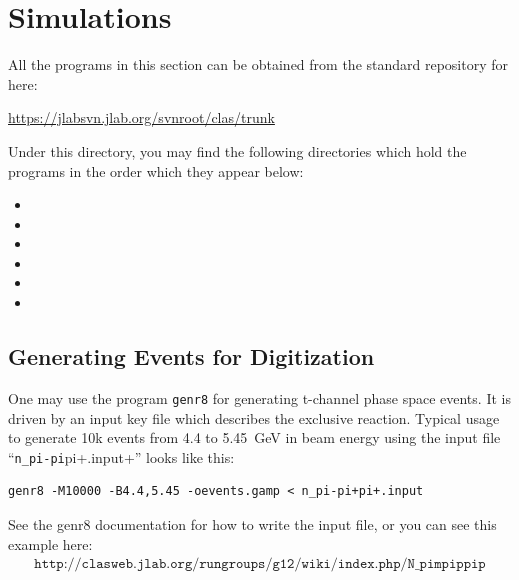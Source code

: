 \section{\label{sec:sim}Simulations}

All the programs in this section can be obtained from the standard  repository for  here:
\begin{center}
    \url{https://jlabsvn.jlab.org/svnroot/clas/trunk}
\end{center}
Under this directory, you may find the following directories which hold the programs in the order which they appear below:
\begin{itemize}
    \item {}
    \item {}
    \item {}
    \item {}
    \item {}
    \item {}
\end{itemize}

\subsection{\label{sec:sim.gen}Generating Events for Digitization}

One may use the program \texttt{genr8} for generating t-channel phase space events. It is driven by an input key file which describes the exclusive reaction. Typical usage to generate 10k events from 4.4 to 5.45~GeV in beam energy using the input file ``\verb+n_pi-pi+pi+.input+'' looks like this:
\begin{verbatim}
genr8 -M10000 -B4.4,5.45 -oevents.gamp < n_pi-pi+pi+.input
\end{verbatim}
See the genr8 documentation for how to write the input file, or you can see this example here:
\begin{align}
    \texttt{http://clasweb.jlab.org/rungroups/g12/wiki/index.php/N\_pimpippip} \nonumber
\end{align}

